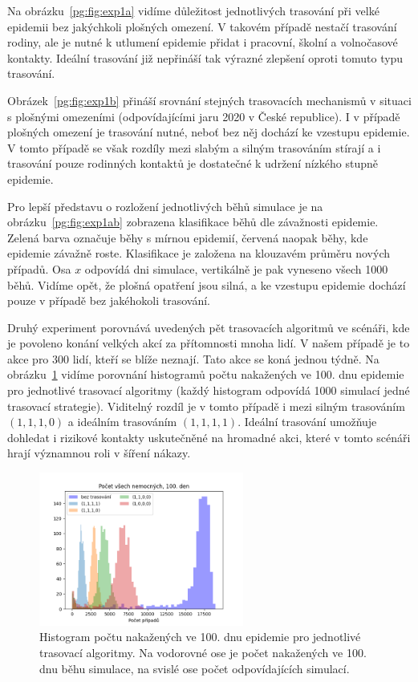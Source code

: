 Na obrázku~\ref{pg:fig:exp1a} vidíme důležitost jednotlivých trasování při
velké epidemii bez jakýchkoli plošných omezení. V takovém případě
nestačí trasování rodiny, ale je nutné k utlumení epidemie přidat i
pracovní, školní a volnočasové kontakty. Ideální trasování již
nepřináší tak výrazné zlepšení oproti tomuto typu trasování.

Obrázek~\ref{pg:fig:exp1b} přináší srovnání stejných trasovacích
mechanismů v situaci s plošnými omezeními (odpovídajícími jaru 2020 v
České republice). I v případě plošných omezení je trasování nutné,
neboť bez něj dochází ke vzestupu epidemie. V tomto případě
se však rozdíly mezi slabým a silným trasováním stírají a i trasování
pouze rodinných kontaktů je dostatečné k udržení nízkého stupně epidemie. 

Pro lepší představu o rozložení jednotlivých běhů simulace je na
obrázku~\ref{pg:fig:exp1ab} zobrazena klasifikace běhů dle závažnosti
epidemie. Zelená barva označuje běhy s mírnou epidemií, červená naopak běhy,
kde epidemie závažně roste. Klasifikace je založena na klouzavém průměru
nových případů. Osa $x$ odpovídá dni simulace, vertikálně je pak vyneseno
všech 1000 běhů. Vidíme opět, že plošná opatření jsou silná, a ke vzestupu
epidemie dochází pouze v případě bez jakéhokoli trasování. 


Druhý experiment porovnává uvedených pět trasovacích algoritmů ve
scénáři, kde je povoleno konání velkých akcí za přítomnosti mnoha
lidí. V našem případě je to akce pro 300 lidí, kteří se blíže
neznají. Tato akce se koná jednou týdně. Na obrázku~\ref{pg:fig:exp2}
vidíme porovnání histogramů počtu nakažených ve 100. dnu epidemie pro
jednotlivé trasovací algoritmy (každý histogram odpovídá 1000
simulací jedné trasovací strategie). Viditelný rozdíl je v tomto
případě i mezi silným trasováním $(1, 1, 1, 0)$ a ideálním trasováním
$(1, 1, 1, 1)$. Ideální trasování umožňuje dohledat i rizikové
kontakty uskutečněné na hromadné akci, které v tomto scénáři hrají
významnou roli v šíření nákazy.

\begin{figure}[ht!]
  \centering
  \includegraphics[width=0.6\textwidth]{pic/histogram_party2.png}
  \caption{Histogram  počtu nakažených ve 100. dnu epidemie pro jednotlivé trasovací algoritmy.
  Na vodorovné ose je počet nakažených ve 100. dnu běhu simulace, na svislé ose počet odpovídajících simulací.}
  \label{pg:fig:exp2}
\end{figure}


